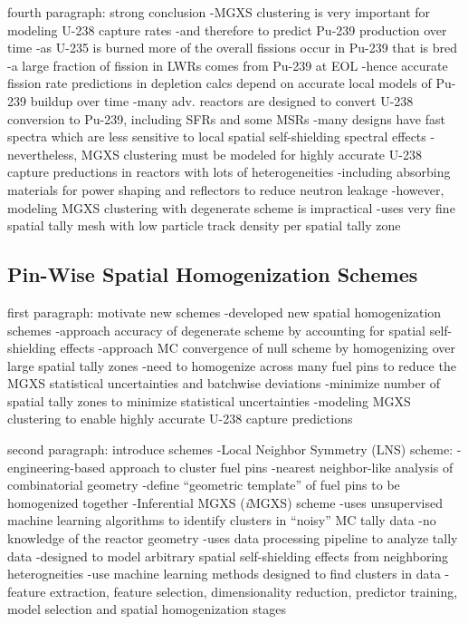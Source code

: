 fourth paragraph: strong conclusion
-MGXS clustering is very important for modeling U-238 capture rates
  -and therefore to predict Pu-239 production over time
  -as U-235 is burned more of the overall fissions occur in Pu-239 that is bred
  -a large fraction of fission in LWRs comes from Pu-239 at EOL  
  -hence accurate fission rate predictions in depletion calcs depend on accurate local models of Pu-239 buildup over time
  -many adv. reactors are designed to convert U-238 conversion to Pu-239, including SFRs and some MSRs
    -many designs have fast spectra which are less sensitive to local spatial self-shielding spectral effects
    -nevertheless, MGXS clustering must be modeled for highly accurate U-238 capture preductions in reactors with lots of heterogeneities
      -including absorbing materials for power shaping and reflectors to reduce neutron leakage
-however, modeling MGXS clustering with degenerate scheme is impractical
  -uses very fine spatial tally mesh with low particle track density per spatial tally zone

\subsection{Pin-Wise Spatial Homogenization Schemes}
\label{subsec:chap12-homogenization-schemes}

first paragraph: motivate new schemes
-developed new spatial homogenization schemes
  -approach accuracy of degenerate scheme by accounting for spatial self-shielding effects
  -approach MC convergence of null scheme by homogenizing over large spatial tally zones
-need to homogenize across many fuel pins to reduce the MGXS statistical uncertainties and batchwise deviations
-minimize number of spatial tally zones to minimize statistical uncertainties
-modeling MGXS clustering to enable highly accurate U-238 capture predictions

second paragraph: introduce schemes
-Local Neighbor Symmetry (LNS) scheme:
  -engineering-based approach to cluster fuel pins
  -nearest neighbor-like analysis of combinatorial geometry
  -define ``geometric template'' of fuel pins to be homogenized together
-Inferential \ac{MGXS} (\textit{i}\ac{MGXS}) scheme
  -uses unsupervised machine learning algorithms to identify clusters in ``noisy'' \ac{MC} tally data
  -no knowledge of the reactor geometry
  -uses data processing pipeline to analyze tally data
  -designed to model arbitrary spatial self-shielding effects from neighboring heterogneities
  -use machine learning methods designed to find clusters in data
    -feature extraction, feature selection, dimensionality reduction, predictor training, model selection and spatial homogenization stages

